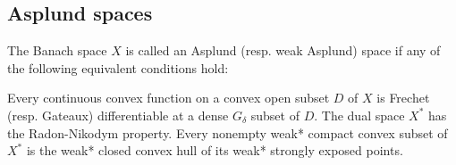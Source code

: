 \subsection{Asplund spaces}\label{subsec:asplund_spaces}

\begin{definition}\label{def:asplund_space}
  The Banach space \( X \) is called an Asplund (resp. weak Asplund) space if any of the following equivalent conditions hold:

  \begin{defenum}
    \cite[theorem 2.14]{Phelps1993} Every continuous convex function on a convex open subset \( D \) of \( X \) is Frechet (resp. Gateaux) differentiable at a dense \( G_\delta \) subset of \( D \).
    \cite[definition 5.2]{Phelps1993} The dual space \( X^* \) has the Radon-Nikodym property.
    \cite[theorem 5.12]{Phelps1993} Every nonempty weak* compact convex subset of \( X^* \) is the weak* closed convex hull of its weak* strongly exposed points.
  \end{defenum}
\end{definition}
